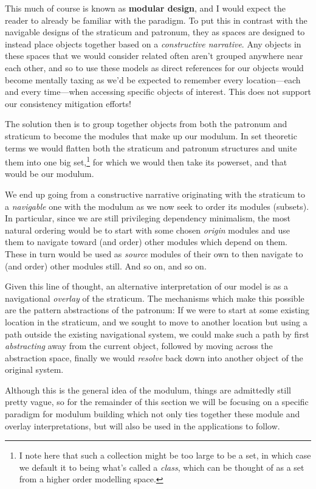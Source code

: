 \documentclass[twoside]{article}
\newcommand{\strong}[1]{{\bfseries #1}}
\begin{document}
This much of course is known as \strong{modular design}, and I would expect the reader to already be familiar with the paradigm.
To put this in contrast with the navigable designs of the straticum and patronum, they as spaces are designed to instead place
objects together based on a \emph{constructive narrative}. Any objects in these spaces that we would consider related often
aren't grouped anywhere near each other, and so to use these models as direct references for our objects would become mentally
taxing as we'd be expected to remember every location---each and every time---when accessing specific objects of interest.
This does not support our consistency mitigation efforts!

The solution then is to group together objects from both the patronum and straticum to become the modules that make up our
modulum. In set theoretic terms we would flatten both the straticum and patronum structures and unite them into one big
set,\footnote{I note here that such a collection might be too large to be a set, in which case we default it to being
what's called a \emph{class}, which can be thought of as a set from a higher order modelling space.} for which we would
then take its powerset, and that would be our modulum.

We end up going from a constructive narrative originating with the straticum to a \emph{navigable} one with the modulum as
we now seek to order its modules (subsets). In particular, since we are still privileging dependency minimalism, the most
natural ordering would be to start with some chosen \emph{origin} modules and use them to navigate toward (and order) other
modules which depend on them. These in turn would be used as \emph{source} modules of their own to then navigate to
(and order) other modules still. And so on, and so on.

Given this line of thought, an alternative interpretation of our model is as a navigational \emph{overlay} of the straticum.
The mechanisms which make this possible are the pattern abstractions of the patronum: If we were to start at some existing
location in the straticum, and we sought to move to another location but using a path outside the existing navigational
system, we could make such a path by first \emph{abstracting} away from the current object, followed by moving across
the abstraction space, finally we would \emph{resolve} back down into another object of the original system.

Although this is the general idea of the modulum, things are admittedly still pretty vague, so for the remainder
of this section we will be focusing on a specific paradigm for modulum building which not only ties together
these module and overlay interpretations, but will also be used in the applications to follow.
\end{document}
